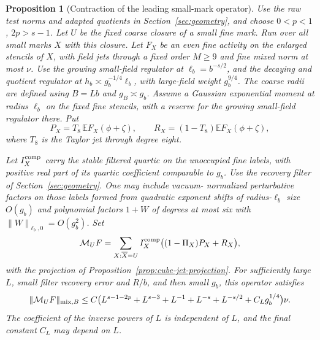 \documentclass[11pt]{article}
\newtheorem{proposition}[theorem]{Proposition}
\theoremstyle{definition}
\begin{document}
\begin{proposition}[Contraction of the leading small-mark operator]
\label{prop:cube-mark}
Use the raw test norms and adapted quotients in
Section~\ref{sec:geometry}, and choose \(0<p<1\), \(2p>s-1\). Let \(U\)
be the fixed coarse closure of a small fine mark. Run over all
small marks \(X\) with this closure. Let \(F_X\) be an even fine activity
on the enlarged stencils of \(X\), with field jets through a
fixed order \(M\ge9\) and fine mixed norm at most \(\nu\). Use
the growing small-field regulator at \(\ell_b=b^{-s/2}\), and the
decaying and quotient regulator at \(h_b\asymp g_b^{-1/4}\ell_b\),
with large-field weight \(g_b^{9/4}\). The coarse radii are
defined using \(B=Lb\) and \(g_B\asymp g_b\).
Assume a Gaussian exponential moment at radius \(\ell_b\)
on the fixed fine stencils, with a reserve for the growing
small-field regulator there. Put
\begin{equation}
 P_X=T_8\,\mathbb E F_X(\phi+\zeta),\qquad
 R_X=(1-T_8)\mathbb E F_X(\phi+\zeta),
\end{equation}
where \(T_8\) is the Taylor jet through degree eight.

Let \(I_X^{\rm comp}\) carry the stable filtered quartic on
the unoccupied fine labels, with positive real part of its
quartic coefficient comparable to \(g_b\). Use the recovery
filter of Section~\ref{sec:geometry}. One may include vacuum-
normalized perturbative factors on those labels formed from
quadratic exponent shifts of radius-\(\ell_b\) size \(O(g_b)\)
and polynomial factors \(1+W\) of degrees at most six with
\(\|W\|_{\ell_b,0}=O(g_b^2)\).
Set
\begin{equation}
 {\cal M}_{U}F=\sum_{X:\overline X=U}
 I_X^{\rm comp}\bigl((1-\Pi_X)P_X+R_X\bigr),
\end{equation}
with the projection of Proposition~\ref{prop:cube-jet-projection}.
For sufficiently large \(L\), small filter recovery error and
\(R/b\), and then small \(g_b\), this operator satisfies
\begin{equation}
 \|{\cal M}_{U}F\|_{\mathrm{mix},B}
 \le C\bigl(L^{s-1-2p}+L^{s-3}+L^{-1}+L^{-s}+L^{-s/2}
                    +C_Lg_b^{1/4}\bigr)\nu .
\end{equation}
The coefficient of the inverse powers of \(L\) is independent
of \(L\), and the final constant \(C_L\) may depend on \(L\).
\end{proposition}
\end{document}
